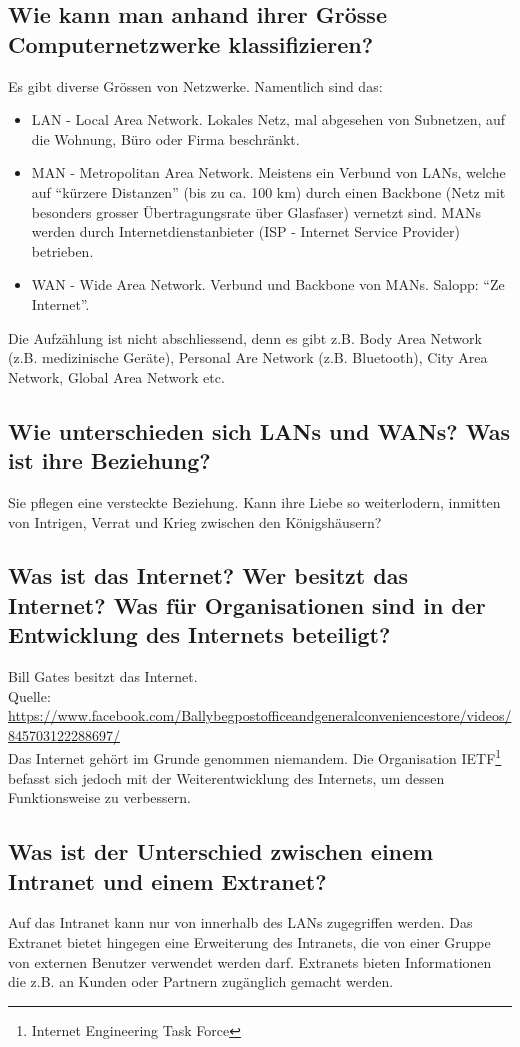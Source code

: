 \subsection*{Wie kann man anhand ihrer Grösse Computernetzwerke klassifizieren?}
Es gibt diverse Grössen von Netzwerke. Namentlich sind das:
\begin{itemize}
    \item LAN - Local Area Network. Lokales Netz, mal abgesehen von Subnetzen, auf die Wohnung, Büro oder Firma beschränkt.
    \item MAN - Metropolitan Area Network. Meistens ein Verbund von LANs, welche auf ``kürzere Distanzen'' (bis zu ca. 100 km) durch einen Backbone (Netz mit besonders grosser Übertragungsrate über Glasfaser) vernetzt sind. MANs werden durch Internetdienstanbieter (ISP - Internet Service Provider) betrieben.
    \item WAN - Wide Area Network. Verbund und Backbone von MANs. Salopp: ``Ze Internet''.
\end{itemize}
Die Aufzählung ist nicht abschliessend, denn es gibt z.B. Body Area Network (z.B. medizinische Geräte), Personal Are Network (z.B. Bluetooth), City Area Network, Global Area Network etc.
\subsection*{Wie unterschieden sich LANs und WANs? Was ist ihre Beziehung?}
Sie pflegen eine versteckte Beziehung. Kann ihre Liebe so weiterlodern, inmitten von Intrigen, Verrat und Krieg zwischen den Königshäusern?
\subsection*{Was ist das Internet? Wer besitzt das Internet? Was für Organisationen sind in der Entwicklung des Internets beteiligt?}
Bill Gates besitzt das Internet.\\
Quelle: \url{https://www.facebook.com/Ballybegpostofficeandgeneralconveniencestore/videos/845703122288697/}\\
Das Internet gehört im Grunde genommen niemandem. Die Organisation IETF\footnote{Internet Engineering Task Force} befasst sich jedoch mit der Weiterentwicklung des Internets, um dessen Funktionsweise zu verbessern.
\subsection*{Was ist der Unterschied zwischen einem Intranet und einem Extranet?}
Auf das Intranet kann nur von innerhalb des LANs zugegriffen werden. Das Extranet bietet hingegen eine Erweiterung des Intranets, die von einer Gruppe von externen Benutzer verwendet werden darf. Extranets bieten Informationen die z.B. an Kunden oder Partnern zugänglich gemacht werden.
